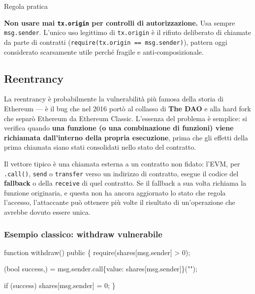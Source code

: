 \documentclass[
  italian,
  openany]{book}
\newenvironment{Shaded}{\begin{snugshade}}{\end{snugshade}}
\newcommand{\NormalTok}[1]{#1}
\begin{document}
\begin{calloutwarning}{Regola pratica}

\textbf{Non usare mai \texttt{tx.origin} per controlli di
autorizzazione.} Usa sempre \texttt{msg.sender}. L'unico uso legittimo
di \texttt{tx.origin} è il rifiuto deliberato di chiamate da parte di
contratti (\texttt{require(tx.origin\ ==\ msg.sender)}), pattern oggi
considerato scarsamente utile perché fragile e anti-composizionale.

\end{calloutwarning}

\subsection{Reentrancy}\label{reentrancy}

La reentrancy è probabilmente la vulnerabilità più famosa della storia
di Ethereum --- è il bug che nel 2016 portò al collasso di \textbf{The
DAO} e alla hard fork che separò Ethereum da Ethereum Classic. L'essenza
del problema è semplice: si verifica quando \textbf{una funzione (o una
combinazione di funzioni) viene richiamata dall'interno della propria
esecuzione}, prima che gli effetti della prima chiamata siano stati
consolidati nello stato del contratto.

Il vettore tipico è una chiamata esterna a un contratto non fidato:
l'EVM, per \texttt{.call()}, \texttt{send} o \texttt{transfer} verso un
indirizzo di contratto, esegue il codice del \textbf{fallback} o della
\texttt{receive} di quel contratto. Se il fallback a sua volta richiama
la funzione originaria, e questa non ha ancora aggiornato lo stato che
regola l'accesso, l'attaccante può ottenere più volte il risultato di
un'operazione che avrebbe dovuto essere unica.

\subsubsection{Esempio classico: withdraw
vulnerabile}\label{esempio-classico-withdraw-vulnerabile}

\begin{Shaded}
\begin{Highlighting}[]
\NormalTok{function withdraw() public \{}
\NormalTok{    require(shares[msg.sender] \textgreater{} 0);}

\NormalTok{    (bool success,) = msg.sender.call\{value: shares[msg.sender]\}("");}

\NormalTok{    if (success)}
\NormalTok{        shares[msg.sender] = 0;}
\NormalTok{\}}
\end{Highlighting}
\end{Shaded}
\end{document}
